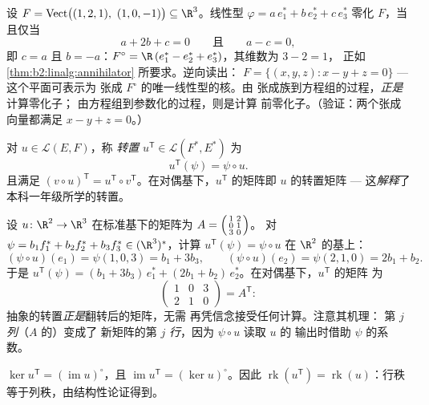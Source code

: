 \begin{example}[零化子的两个方向]\label{ex:b2:linalg:annihilatorwork}
设 $F = \operatorname{Vect}\bigl((1, 2, 1),\ (1, 0, -1)\bigr)
\subseteq \R^3$。线性型 $\varphi = a\,e_1^* + b\,e_2^* + c\,e_3^*$
零化 $F$，当且仅当
\[
a + 2b + c = 0
\qquad\text{且}\qquad
a - c = 0 ,
\]
即 $c = a$ 且 $b = -a$：$F^\circ = \R\,(e_1^* - e_2^* +
e_3^*)$，其维数为 $3 - 2 = 1$，
正如 \cref{thm:b2:linalg:annihilator} 所要求。逆向读出：
$F = \{(x, y, z) : x - y + z = 0\}$ --- 这个平面可表示为
张成 $F^\circ$ 的唯一线性型的核。由
张成族到方程组的过程，\emph{正是}计算零化子；
由方程组到参数化的过程，则是计算
前零化子。（验证：两个张成向量都满足 $x - y +
z = 0$。）
\end{example}

\begin{definition}[转置映射]\label{def:b2:linalg:transpose}
对 $u \in \mathcal{L}(E, F)$，称 \emph{转置} $u^{\mathsf T} \in \mathcal{L}(F^*, E^*)$ 为
\[
u^{\mathsf T}(\psi) = \psi \circ u .
\]
且满足 $(v \circ u)^{\mathsf T} = u^{\mathsf T} \circ v^{\mathsf
T}$。在对偶基下，$u^{\mathsf T}$ 的矩阵即
$u$ 的转置矩阵 --- 这\emph{解释}了
本科一年级所学的转置。
\end{definition}

\begin{example}[转置，逐项计算]\label{ex:b2:linalg:transposework}
设 $u \colon \R^2 \to \R^3$ 在标准基下的矩阵为 $A =
\begin{psmallmatrix} 1 & 2\\ 0 & 1\\ 3 & 0\end{psmallmatrix}$。
对 $\psi = b_1f_1^* + b_2f_2^* + b_3f_3^*
\in (\R^3)^*$，计算 $u^{\mathsf T}(\psi) = \psi \circ u$ 在
$\R^2$ 的基上：
\[
(\psi \circ u)(e_1) = \psi(1, 0, 3) = b_1 + 3b_3,
\qquad
(\psi \circ u)(e_2) = \psi(2, 1, 0) = 2b_1 + b_2 .
\]
于是 $u^{\mathsf T}(\psi) = (b_1 + 3b_3)\,e_1^* + (2b_1 +
b_2)\,e_2^*$。在对偶基下，$u^{\mathsf T}$ 的矩阵
为
\[
\begin{pmatrix} 1 & 0 & 3\\ 2 & 1 & 0\end{pmatrix}
= A^{\mathsf T} :
\]
抽象的转置\emph{正是}翻转后的矩阵，无需
再凭信念接受任何计算。注意其机理：
第 $j$ \emph{列}（$A$ 的）变成了
新矩阵的第 $j$ \emph{行}，因为 $\psi \circ u$ 读取 $u$ 的
输出时借助 $\psi$ 的系数。
\end{example}

\begin{proposition}\label{prop:b2:linalg:transposerank}
$\ker u^{\mathsf T} = (\operatorname{im} u)^{\circ}$，且
$\operatorname{im} u^{\mathsf T} = (\ker u)^{\circ}$。因此
$\operatorname{rk}(u^{\mathsf T}) = \operatorname{rk}(u)$：行秩
等于列秩，由结构性论证得到。
\end{proposition}


